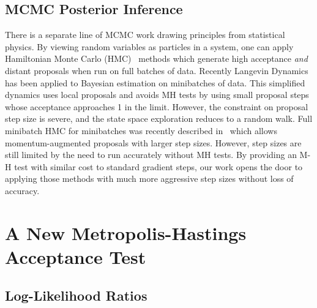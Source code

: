 \documentclass[twoside]{article} \usepackage{aistats2017}
\begin{document}
\subsection{MCMC Posterior Inference}
There is a separate line of MCMC work drawing principles from statistical
physics. By viewing random variables as particles in a system, one can apply
Hamiltonian Monte Carlo (HMC)~\citep{mcmc_hamiltonian_2010} methods which
generate high acceptance \emph{and} distant proposals when run on full batches
of data. Recently Langevin Dynamics~\citep{langevin_2011,conf/icml/AhnBW12} has
been applied to Bayesian estimation on minibatches of data. This simplified
dynamics uses local proposals and avoids MH tests by using small proposal steps
whose acceptance approaches 1 in the limit. However, the constraint on proposal
step size is severe, and the state space exploration reduces to a random walk.
Full minibatch HMC for minibatches was recently described in~\citet{sghmc_2014}
which allows momentum-augmented proposals with larger step sizes. However, step
sizes are still limited by the need to run accurately without MH tests.  By providing
an M-H test with similar cost to standard gradient steps, our
work opens the door to applying those methods with much more aggressive step
sizes without loss of accuracy. 




\section{A New Metropolis-Hastings Acceptance Test}\label{sec:our_algorithm}

\subsection{Log-Likelihood Ratios}\label{ssec:log_likelihood_ratios}
\end{document}
